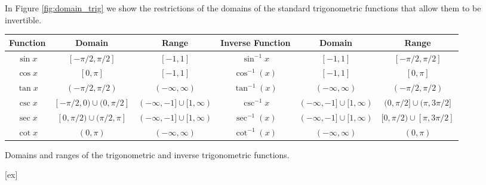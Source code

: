 In Figure \ref{fig:domain_trig} we show the restrictions of the domains of the standard trigonometric functions that allow them to be invertible.\\

\small\noindent
\begin{tabular}{cccccc}
Function & Domain & Range &\parbox[b]{40pt}{\centering Inverse Function} & Domain & Range\\ \hline
\rule{0pt}{12pt} $\sin x$ & $[-\pi/2, \pi/2]$ & $[-1,1]$&$\sin^{-1} x$ & $[-1,1]$ & $[-\pi/2, \pi/2]$ \\
\rule{0pt}{12pt}$\cos x$ & $[0,\pi]$ & $[-1,1]$&$\cos^{-1}(x)$ & $[-1,1]$ & $[0,\pi]$ \\
\rule{0pt}{12pt}$\tan x$ & $(-\pi/2,\pi/2)$ & $(-\infty,\infty)$&$\tan^{-1}(x)$ & $(-\infty,\infty)$ & $(-\pi/2,\pi/2)$	\\
\rule{0pt}{12pt} $\csc x$ & $[-\pi/2,0)\cup (0, \pi/2]$ & $(-\infty,-1]\cup [1,\infty)$&$\csc^{-1} x$ & $(-\infty,-1]\cup [1,\infty)$ & $(0,\pi/2]\cup (\pi, 3\pi/2]$  \\
\rule{0pt}{12pt}$\sec x$ & $[0,\pi/2)\cup (\pi/2,\pi]$ & $(-\infty,-1]\cup [1,\infty)$&$\sec^{-1}(x)$ & $(-\infty,-1]\cup [1,\infty)$ & $[0,\pi/2)\cup [\pi,3\pi/2]$ \\
\rule{0pt}{12pt}$\cot x$ & $(0,\pi)$ & $(-\infty,\infty)$&$\cot^{-1}(x)$ &  $ (-\infty,\infty)$ & $(0,\pi)$	
\end{tabular}
\caption{Domains and ranges of the trigonometric and inverse trigonometric functions. \label{fig:domain_trig}}
[ex]
